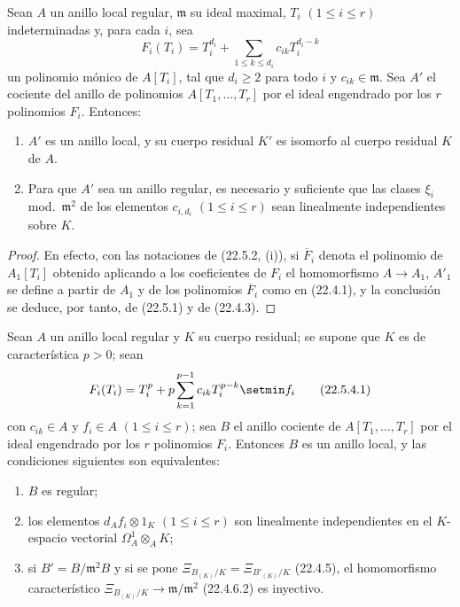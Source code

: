 \begin{corollary}[22.5.3]
\label{0.22.5.3-fr}
Sean $A$ un anillo local regular, $\mathfrak m$ su ideal maximal,
$T_i$ $(1\leqslant i\leqslant r)$ indeterminadas y, para cada $i$, sea
\begin{equation}
\label{0.22.5.3.1-fr}
  F_i(T_i)=T_i^{d_i}+\sum_{1\leqslant k\leqslant d_i}c_{ik}T_i^{d_i-k}
  \tag{22.5.3.1}
\end{equation}
un polinomio mónico de $A[T_i]$, tal que $d_i\geqslant2$ para todo $i$ y
$c_{ik}\in\mathfrak m$. Sea $A'$ el cociente del anillo de polinomios
$A[T_1,\ldots,T_r]$ por el ideal engendrado por los $r$ polinomios $F_i$. Entonces:
\begin{enumerate}
  \item[\rm(i)] $A'$ es un anillo local, y su cuerpo residual $K'$ es
  isomorfo al cuerpo residual $K$ de $A$.
  \item[\rm(ii)] Para que $A'$ sea un anillo regular, es necesario y suficiente
  que las clases $\xi_i$ \textup{mod.}~$\mathfrak m^2$ de los elementos $c_{i,d_i}$
  $(1\leqslant i\leqslant r)$ sean linealmente independientes sobre $K$.
\end{enumerate}
\end{corollary}

\begin{proof}
En efecto, con las notaciones de (22.5.2, (i)), si $\overline F_i$ denota el
polinomio de $A_1[T_i]$ obtenido aplicando a los coeficientes de $F_i$
el homomorfismo $A\longrightarrow A_1$, $A'_1$ se define a partir de $A_1$ y
de los polinomios $\overline F_i$ como en (22.4.1), y la conclusión se deduce,
por tanto, de (22.5.1) y de (22.4.3).
\end{proof}

\begin{theorem}[22.5.4]
\label{0.22.5.4-fr}
Sean $A$ un anillo local regular y $K$ su cuerpo residual; se supone que
$K$ es de característica $p>0$; sean
\begin{equation}
\label{0.22.5.4.1-fr}
  F_i(T_i)=T_i^p+p\sum_{k=1}^{p-1}c_{ik}T_i^{p-k}\setmin f_i
  \tag{22.5.4.1}
\end{equation}
con $c_{ik}\in A$ y $f_i\in A$ $(1\leqslant i\leqslant r)$; sea $B$
el anillo cociente de $A[T_1,\ldots,T_r]$ por el ideal engendrado por los $r$
polinomios $F_i$. Entonces $B$ es un anillo local, y las condiciones siguientes
son equivalentes:
\begin{enumerate}
  \item[\textup{a)}] $B$ es regular;
  \item[\textup{b)}] los elementos $d_Af_i\otimes1_K$ $(1\leqslant i\leqslant r)$ son
  linealmente independientes en el $K$-espacio vectorial
  $\Omega^1_A\otimes_AK$;
  \item[\textup{c)}] si $B'=B/\mathfrak m^2B$ y si se pone
  $\Xi_{B_{(K)}/K}=\Xi_{B'_{(K)}/K}$ \textup{(22.4.5)}, el homomorfismo
  característico $\Xi_{B_{(K)}/K}\longrightarrow\mathfrak m/\mathfrak m^2$
  \textup{(22.4.6.2)} es inyectivo.
\end{enumerate}
\end{theorem}

